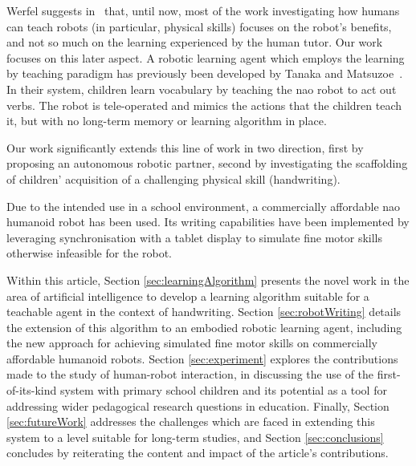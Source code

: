 \documentclass{sig-alternate}
\begin{document}
Werfel suggests in~\cite{Werfel2014} that, until now, most of the work investigating how
humans can teach robots (in particular, physical skills) focuses on the robot's
benefits, and not so much on the learning experienced by the human tutor. Our
work focuses on this later aspect. A robotic learning agent which employs the learning by teaching paradigm has 
previously been developed by Tanaka and Matsuzoe~\cite{Tanaka2012}. In their
system, children learn vocabulary by teaching the {\sc nao} robot to act out 
verbs. The robot is tele-operated and mimics the actions that the children
teach it, but with no long-term memory or learning algorithm in place.

Our work significantly extends this line of work in two direction, first by
proposing an autonomous robotic partner, second by investigating the scaffolding
of children' acquisition of a challenging physical skill (handwriting).


Due to the intended use in a school environment, a commercially
affordable {\sc nao} humanoid robot has been used. Its writing capabilities 
have been implemented by leveraging synchronisation with a tablet display to
simulate fine motor skills otherwise infeasible for the robot. 

Within this article, Section \ref{sec:learningAlgorithm} presents the novel work in the area of
artificial intelligence to develop a learning algorithm suitable for a teachable
agent in the context of handwriting. Section \ref{sec:robotWriting} details the
extension of this algorithm to an embodied robotic learning agent, including the
new approach for achieving simulated fine motor skills on commercially
affordable humanoid robots. Section \ref{sec:experiment} explores the 
contributions made to the study of human-robot interaction, in discussing the
use of the first-of-its-kind system with primary school children and its potential as a tool for
addressing wider pedagogical research questions in education. Finally, Section \ref{sec:futureWork} addresses the challenges which are faced in extending this system to a level suitable for long-term studies, and Section \ref{sec:conclusions} concludes by reiterating the content and impact of the article's contributions.
\end{document}
